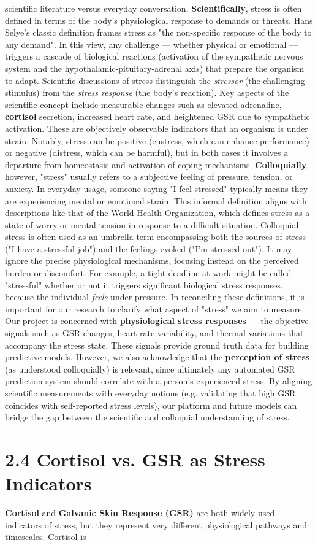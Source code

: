 scientific literature versus everyday conversation. \textbf{Scientifically}, stress is often defined in terms of the body's physiological response to demands or threats. Hans Selye's classic definition frames stress as "the non-specific response of the body to any demand". In this view, any challenge --- whether physical or emotional --- triggers a cascade of biological reactions (activation of the sympathetic nervous system and the hypothalamic-pituitary-adrenal axis) that prepare the organism to adapt. Scientific discussions of stress distinguish the \textit{stressor} (the challenging stimulus) from the \textit{stress response} (the body's reaction). Key aspects of the scientific concept include measurable changes such as elevated adrenaline, \textbf{cortisol} secretion, increased heart rate, and heightened GSR due to sympathetic activation. These are objectively observable indicators that an organism is under strain. Notably, stress can be positive (eustress, which can enhance performance) or negative (distress, which can be harmful), but in both cases it involves a departure from homeostasis and activation of coping mechanisms. \textbf{Colloquially}, however, "stress" usually refers to a subjective feeling of pressure, tension, or anxiety. In everyday usage, someone saying "I feel stressed" typically means they are experiencing mental or emotional strain. This informal definition aligns with descriptions like that of the World Health Organization, which defines stress as a state of worry or mental tension in response to a difficult situation. Colloquial stress is often used as an umbrella term encompassing both the sources of stress ("I have a stressful job") and the feelings evoked ("I'm stressed out"). It may ignore the precise physiological mechanisms, focusing instead on the perceived burden or discomfort. For example, a tight deadline at work might be called "stressful" whether or not it triggers significant biological stress responses, because the individual \textit{feels} under pressure. In reconciling these definitions, it is important for our research to clarify what aspect of "stress" we aim to measure. Our project is concerned with \textbf{physiological stress responses} --- the objective signals such as GSR changes, heart rate variability, and thermal variations that accompany the stress state. These signals provide ground truth data for building predictive models. However, we also acknowledge that the \textbf{perception of stress} (as understood colloquially) is relevant, since ultimately any automated GSR prediction system should correlate with a person's experienced stress. By aligning scientific measurements with everyday notions (e.g. validating that high GSR coincides with self-reported stress levels), our platform and future models can bridge the gap between the scientific and colloquial understanding of stress. \section{2.4 Cortisol vs. GSR as Stress Indicators} \textbf{Cortisol} and \textbf{Galvanic Skin Response (GSR)} are both widely used indicators of stress, but they represent very different physiological pathways and timescales. Cortisol is 